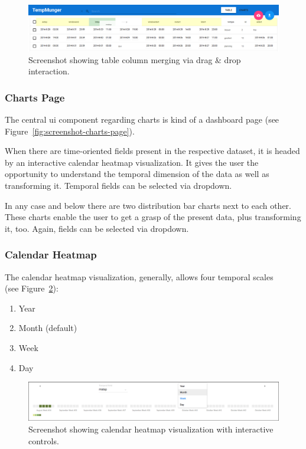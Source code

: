 \begin{figure}[h]
  \centering
  \includegraphics[width=1.0\textwidth]{figures/implementation/screenshot-column-merge}
  \caption{Screenshot showing table column merging via drag \& drop interaction.}
  \label{fig:screenshot-column-merge}
\end{figure}

\subsubsection{Charts Page}

The central \gls{ui} component regarding charts is kind of a dashboard page (see Figure~\ref{fig:screenshot-charts-page}).

When there are time-oriented fields present in the respective dataset, it is headed by an interactive calendar heatmap visualization. It gives the user the opportunity to understand the temporal dimension of the data as well as transforming it. Temporal fields can be selected via dropdown.

In any case and below there are two distribution bar charts next to each other.
These charts enable the user to get a grasp of the present data, plus transforming it, too.
Again, fields can be selected via dropdown.

\subsubsection{Calendar Heatmap}

The calendar heatmap visualization, generally, allows four temporal scales \\(see Figure~\ref{fig:screenshot-calendar-heatmap}):

\begin{enumerate}
  \item Year
  \item Month (default)
  \item Week
  \item Day
\end{enumerate}

\begin{figure}[h]
  \centering
  \includegraphics[width=1.0\textwidth]{figures/implementation/screenshot-calendar-heatmap}
  \caption{Screenshot showing calendar heatmap visualization with interactive controls.}
  \label{fig:screenshot-calendar-heatmap}
\end{figure}

